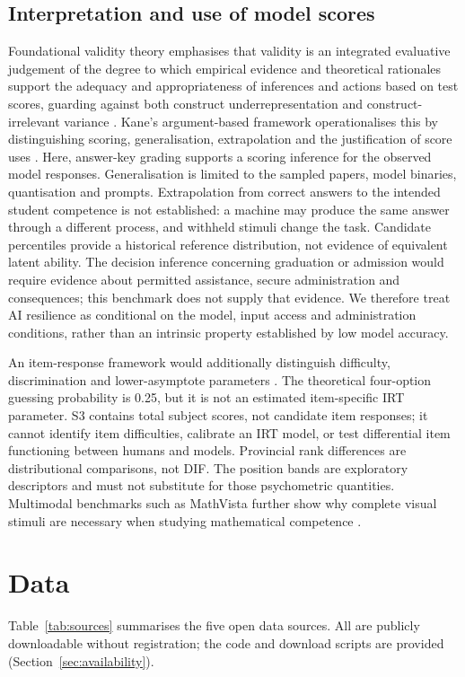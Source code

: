 \documentclass[preprint,12pt,authoryear,nonatbib]{elsarticle}
\begin{document}
\subsection{Interpretation and use of model scores}
Foundational validity theory emphasises that validity is an integrated evaluative judgement of the degree to which empirical evidence and theoretical rationales support the adequacy and appropriateness of inferences and actions based on test scores, guarding against both construct underrepresentation and construct-irrelevant variance \citep{messick1995}. Kane's argument-based framework operationalises this by distinguishing scoring, generalisation, extrapolation and the justification of score uses \citep{kane2013}. Here, answer-key grading supports a scoring inference for the observed model responses. Generalisation is limited to the sampled papers, model binaries, quantisation and prompts. Extrapolation from correct answers to the intended student competence is not established: a machine may produce the same answer through a different process, and withheld stimuli change the task. Candidate percentiles provide a historical reference distribution, not evidence of equivalent latent ability. The decision inference concerning graduation or admission would require evidence about permitted assistance, secure administration and consequences; this benchmark does not supply that evidence. We therefore treat AI resilience as conditional on the model, input access and administration conditions, rather than an intrinsic property established by low model accuracy.

An item-response framework would additionally distinguish difficulty, discrimination and lower-asymptote parameters \citep{lord1974}. The theoretical four-option guessing probability is 0.25, but it is not an estimated item-specific IRT parameter. S3 contains total subject scores, not candidate item responses; it cannot identify item difficulties, calibrate an IRT model, or test differential item functioning between humans and models. Provincial rank differences are distributional comparisons, not DIF. The position bands are exploratory descriptors and must not substitute for those psychometric quantities. Multimodal benchmarks such as MathVista further show why complete visual stimuli are necessary when studying mathematical competence \citep{lu2024mathvista}.

\section{Data}
Table~\ref{tab:sources} summarises the five open data sources. All are publicly downloadable without registration; the code and download scripts are provided (Section~\ref{sec:availability}).
\end{document}
